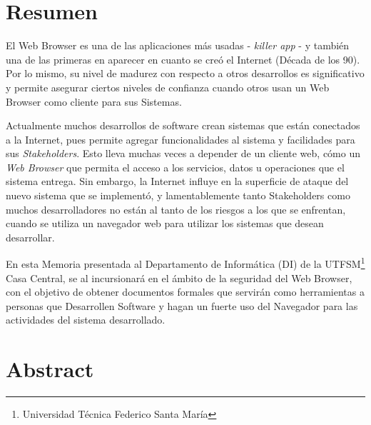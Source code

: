 
\section*{Resumen}
\label{chap:resumen}

El Web Browser es una de las aplicaciones más usadas - \textit{killer app} - y también una de las primeras en aparecer en cuanto se creó el Internet (Década de los 90). Por lo mismo, su nivel de madurez con respecto a otros desarrollos es significativo y permite asegurar ciertos niveles de confianza cuando otros usan un Web Browser como cliente para sus Sistemas. 

Actualmente muchos desarrollos de software crean sistemas que están conectados a la Internet, pues permite agregar funcionalidades al sistema y facilidades para sus \textit{Stakeholders}. Esto lleva muchas veces a depender de un cliente web, cómo un \textit{Web Browser} que permita el acceso a los servicios, datos u operaciones que el sistema entrega. Sin embargo, la Internet influye en la superficie de ataque del nuevo sistema que se implementó, y lamentablemente tanto Stakeholders como muchos desarrolladores no están al tanto de los riesgos a los que se enfrentan, cuando se utiliza un navegador web para utilizar los sistemas que desean desarrollar.

En esta Memoria presentada al Departamento de Informática (DI) de la UTFSM\footnote{Universidad Técnica Federico Santa María} Casa Central, se al incursionará en el ámbito de la seguridad del Web Browser, con el objetivo de obtener documentos formales que servirán como herramientas a personas que Desarrollen Software y hagan un fuerte uso del Navegador para las actividades del sistema desarrollado.

\section*{Abstract}
\label{chap:abstract}


